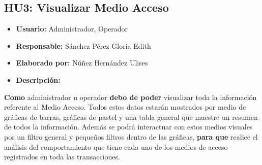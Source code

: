 \subsection{HU3: Visualizar Medio Acceso}
\begin{itemize}
	\item \textbf{Usuario:} Administrador, Operador
	\item \textbf{Responsable:} Sánchez Pérez Gloria Edith
	\item \textbf{Elaborado por:} Núñez Hernández Ulises
	\item \textbf{Descripción:}
\end{itemize}
\textbf{Como} administrador u operador \textbf{debo de poder} visualizar toda la información referente al Medio Acceso. Todos estos datos estarán mostrados por medio de gráficas de barras, gráficas de pastel y una tabla general que muestre un resumen de todos la información. Además se podrá interactuar con estos medios visuales por un filtro general y pequeños filtros dentro de las gráficas, \textbf{para que} realice el análisis del comportamiento que tiene cada uno de los medios de acceso registrados en toda las transacciones. 